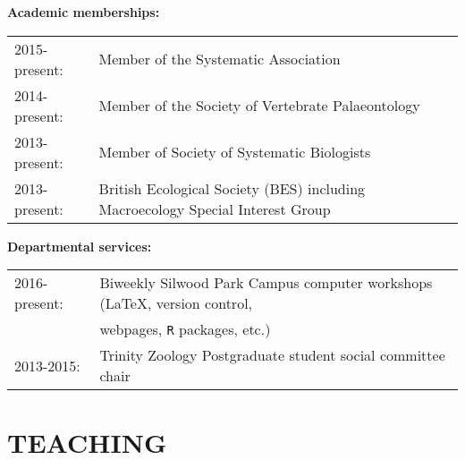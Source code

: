 \documentclass[10pt,a4paper]{article}
\begin{document}
{\bigskip


\bigskip

\raggedright\textbf{Academic memberships:}
\begin{tabular}{ll}
2015-present: & Member of the Systematic Association\\ 
2014-present: & Member of the Society of Vertebrate Palaeontology\\
2013-present: & Member of Society of Systematic Biologists\\
2013-present: & British Ecological Society (BES) including Macroecology Special Interest Group\\
\end{tabular}
\bigskip

\raggedright\textbf{Departmental services:}
\begin{tabular}{ll}
2016-present: & Biweekly Silwood Park Campus computer workshops (\LaTeX, version control,\\
& webpages, \texttt{R} packages, etc.) \\
2013-2015: & Trinity Zoology Postgraduate student social committee chair \\
\end{tabular}
\bigskip


\section{TEACHING}
\bigskip

}
\end{document}
